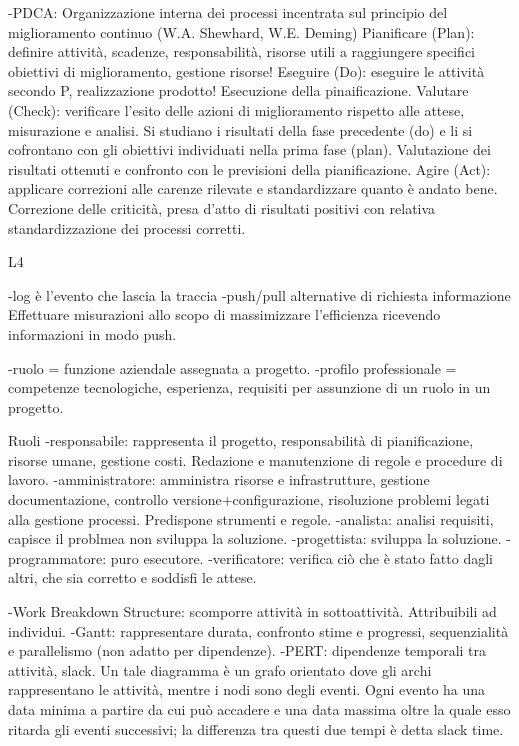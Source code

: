 \documentclass{report}
\begin{document}
-PDCA: Organizzazione interna dei processi incentrata sul principio del miglioramento continuo (W.A. Shewhard, W.E. Deming)
Pianificare (Plan): definire attività, scadenze, responsabilità, risorse utili a raggiungere specifici obiettivi di miglioramento, gestione risorse!
Eseguire (Do): eseguire le attività secondo P, realizzazione prodotto! Esecuzione della pinaificazione.
Valutare (Check): verificare l’esito delle azioni di miglioramento rispetto alle attese, misurazione e analisi. Si studiano i risultati della fase precedente (do) e li si cofrontano con gli obiettivi individuati nella prima fase (plan). Valutazione dei risultati ottenuti e confronto con le previsioni della pianificazione.
Agire (Act): applicare correzioni alle carenze rilevate e standardizzare quanto è andato bene. Correzione delle criticità, presa d'atto di risultati positivi con relativa standardizzazione dei processi corretti.

L4

-log è l'evento che lascia la traccia
-push/pull alternative di richiesta informazione
Effettuare misurazioni allo scopo di massimizzare l'efficienza ricevendo informazioni in modo push.

-ruolo = funzione aziendale assegnata a progetto.
-profilo professionale = competenze tecnologiche, esperienza, requisiti per assunzione di un ruolo in un progetto.

Ruoli
-responsabile: rappresenta il progetto, responsabilità di pianificazione, risorse umane, gestione costi. Redazione e manutenzione di regole e procedure di lavoro.
-amministratore: amministra risorse e infrastrutture, gestione documentazione, controllo versione+configurazione, risoluzione problemi legati alla gestione processi. Predispone strumenti e regole.
-analista: analisi requisiti, capisce il problmea non sviluppa la soluzione.
-progettista: sviluppa la soluzione.
-programmatore: puro esecutore.
-verificatore: verifica ciò che è stato fatto dagli altri, che sia corretto e soddisfi le attese.

-Work Breakdown Structure: scomporre attività in sottoattività. Attribuibili ad individui.
-Gantt: rappresentare durata, confronto stime e progressi, sequenzialità e parallelismo (non adatto per dipendenze).
-PERT: dipendenze temporali tra attività, slack. Un tale diagramma è un grafo orientato dove gli archi rappresentano le attività, mentre i nodi sono degli eventi. Ogni evento ha una data minima a partire da cui può accadere e una data massima oltre la quale esso ritarda gli eventi successivi; la differenza tra questi due tempi è detta slack time.
\end{document}
